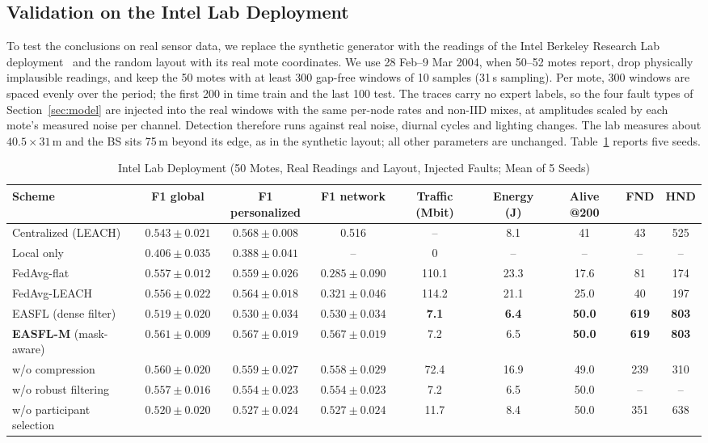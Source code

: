 \documentclass[journal]{IEEEtran}
\begin{document}
\subsection{Validation on the Intel Lab Deployment}\label{sec:intel}
To test the conclusions on real sensor data, we replace the synthetic generator with the readings of the Intel Berkeley Research Lab deployment~\cite{intellab2004} and the random layout with its real mote coordinates. We use 28 Feb--9 Mar 2004, when 50--52 motes report, drop physically implausible readings, and keep the 50 motes with at least 300 gap-free windows of 10 samples (31\,s sampling). Per mote, 300 windows are spaced evenly over the period; the first 200 in time train and the last 100 test. The traces carry no expert labels, so the four fault types of Section~\ref{sec:model} are injected into the real windows with the same per-node rates and non-IID mixes, at amplitudes scaled by each mote's measured noise per channel. Detection therefore runs against real noise, diurnal cycles and lighting changes. The lab measures about $40.5\times31$\,m and the BS sits 75\,m beyond its edge, as in the synthetic layout; all other parameters are unchanged. Table~\ref{tab:intel} reports five seeds.

\begin{table}[t]
\caption{Intel Lab Deployment (50 Motes, Real Readings and Layout, Injected Faults; Mean of 5 Seeds)}\label{tab:intel}
\centering\footnotesize
\begin{tabular}{@{}lcccccccc@{}}
\toprule
Scheme & F1 global & F1 personalized & F1 network & Traffic (Mbit) & Energy (J) & Alive @200 & FND & HND\\
\midrule
Centralized (LEACH) & $0.543\pm0.021$ & $0.568\pm0.008$ & 0.516 & -- & 8.1 & 41 & 43 & 525\\
Local only & $0.406\pm0.035$ & $0.388\pm0.041$ & -- & 0 & -- & -- & -- & --\\
FedAvg-flat & $0.557\pm0.012$ & $0.559\pm0.026$ & $0.285\pm0.090$ & 110.1 & 23.3 & 17.6 & 81 & 174\\
FedAvg-LEACH & $0.556\pm0.022$ & $0.564\pm0.018$ & $0.321\pm0.046$ & 114.2 & 21.1 & 25.0 & 40 & 197\\
EASFL (dense filter) & $0.519\pm0.020$ & $0.530\pm0.034$ & $0.530\pm0.034$ & \textbf{7.1} & \textbf{6.4} & \textbf{50.0} & \textbf{619} & \textbf{803}\\
\textbf{EASFL-M} (mask-aware) & $\mathbf{0.561\pm0.009}$ & $\mathbf{0.567\pm0.019}$ & $\mathbf{0.567\pm0.019}$ & 7.2 & 6.5 & \textbf{50.0} & \textbf{619} & \textbf{803}\\
\quad w/o compression & $0.560\pm0.020$ & $0.559\pm0.027$ & $0.558\pm0.029$ & 72.4 & 16.9 & 49.0 & 239 & 310\\
\quad w/o robust filtering & $0.557\pm0.016$ & $0.554\pm0.023$ & $0.554\pm0.023$ & 7.2 & 6.5 & 50.0 & -- & --\\
\quad w/o participant selection & $0.520\pm0.020$ & $0.527\pm0.024$ & $0.527\pm0.024$ & 11.7 & 8.4 & 50.0 & 351 & 638\\
\bottomrule
\end{tabular}
\end{table}
\end{document}

